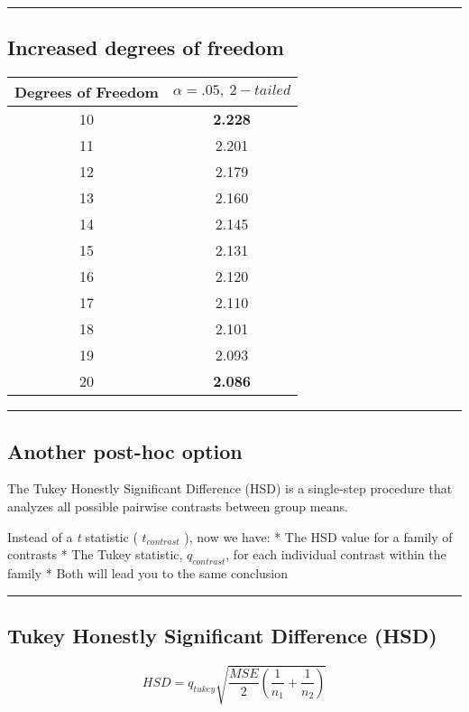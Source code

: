 \documentclass[]{article}
\begin{document}
\begin{center}\rule{0.5\linewidth}{\linethickness}\end{center}

\hypertarget{increased-degrees-of-freedom}{%
\subsection{Increased degrees of
freedom}\label{increased-degrees-of-freedom}}

\begin{longtable}[]{@{}cc@{}}
\toprule
Degrees of Freedom & \(\alpha=.05,\:2-tailed\)\tabularnewline
\midrule
\endhead
10 & \textbf{2.228}\tabularnewline
11 & 2.201\tabularnewline
12 & 2.179\tabularnewline
13 & 2.160\tabularnewline
14 & 2.145\tabularnewline
15 & 2.131\tabularnewline
16 & 2.120\tabularnewline
17 & 2.110\tabularnewline
18 & 2.101\tabularnewline
19 & 2.093\tabularnewline
20 & \textbf{2.086}\tabularnewline
\bottomrule
\end{longtable}

\begin{center}\rule{0.5\linewidth}{\linethickness}\end{center}

\hypertarget{another-post-hoc-option}{%
\subsection{Another post-hoc option}\label{another-post-hoc-option}}

The Tukey Honestly Significant Difference (HSD) is a single-step
procedure that analyzes all possible pairwise contrasts between group
means.

Instead of a \emph{t} statistic ( \(t_{contrast}\) ), now we have: * The
HSD value for a family of contrasts * The Tukey statistic,
\(q_{contrast}\), for each individual contrast within the family * Both
will lead you to the same conclusion

\begin{center}\rule{0.5\linewidth}{\linethickness}\end{center}

\hypertarget{tukey-honestly-significant-difference-hsd}{%
\subsection{Tukey Honestly Significant Difference
(HSD)}\label{tukey-honestly-significant-difference-hsd}}

\[HSD=q_{tukey}\sqrt{\frac{MSE}{2}({\frac{1}{n_1}+\frac{1}{n_2}})}\]
\end{document}
